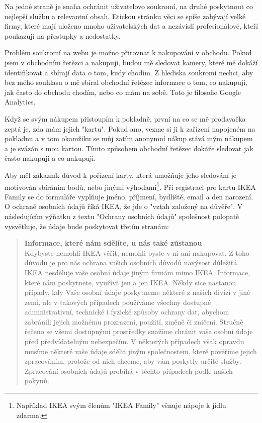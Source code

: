\documentclass[bc,female,java,dept456]{diploma}						%
\begin{document}
Na jedné straně je snaha ochránit uživatelovo soukromí, na druhé poskytnout co nejlepší službu a relevantní obsah. Etickou stránku věci se spíše zabývají velké firmy, které mají uloženo mnoho uživatelských dat a nezávislí profesionálové, kteří poukazují na přestupky a nedostatky.

Problém soukromí na webu je možno přirovnat k nakupování v obchodu. Pokud jsem v obchodním řetězci a nakupuji, budou mě sledovat kamery, které mě dokáží identifikovat a sbírají data o tom, kudy chodím. Z hlediska soukromí nechci, aby bez mého souhlasu o mě sbíral obchodní řetězec informace o tom, co nakupuji, jak často do obchodu chodím, nebo co mám na sobě. Toto je filosofie Google Analytics.

Když se svým nákupem přistoupím k pokladně, první na co se mě prodavačka zeptá je, zda mám jejich "kartu". Pokud ano, vezme si ji k zařízení napojeném na pokladnu a v tom okamžiku se můj zatím anonymní nákup stává mým nákupem a je svázán s mou kartou. Tímto způsobem obchodní řetězec dokáže sledovat jak často nakupuji a co nakupuji.

Aby měl zákazník důvod k pořízení karty, která umožňuje jeho sledování je motivován sbíráním bodů, nebo jinými výhodami\footnote{Například IKEA svým členům "IKEA Family" věnuje nápoje k jídlu zdarma.}. Při registraci pro kartu IKEA Family se do formuláře vyplňuje jméno, příjmení, bydliště, email a den narození. O ochraně osobních údajů říká IKEA, že jde o "vztah založený na důvěře". V následujícím výňatku z textu "Ochrany osobních údajů" spolešnost polopatě vysvětluje, že údaje bude poskytovat třetím stranám:

\begin{quote}
{\bf Informace, které nám sdělíte, u nás také zůstanou}\\
Kdybyste nemohli IKEA věřit, nemohli byste v ní ani nakupovat. Z toho důvodu je pro nás ochrana vašich osobních důvodů navýsost důležitá. IKEA nesděluje vaše osobní údaje jiným firmám mimo IKEA. Informace, které nám poskytnete, využívá jen a jen IKEA. Někdy sice nastanou případy, kdy Vaše osobní údaje poskytneme některé z našich divizí v jiné zemi, ale v takových případech používáme všechny dostupné administrativní, technické i fyzické způsoby ochrany dat, abychom zabránili jejich možnému prozrazení, použití, změně či zničení. Stručně řečeno se všemi dostupnými prostředky snažíme chránit vaše osobní údaje před předvídatelným nebezpečím. V některých případech však opravdu musíme některé vaše údaje sdělit jiným společnostem, které pověříme jejich zpracováním, protože od nich chceme, aby vám poskytly určité služby. Zpracování osobních údajů probíhá v těchto případech podle našich pokynů. 
\end{quote}
\end{document}
